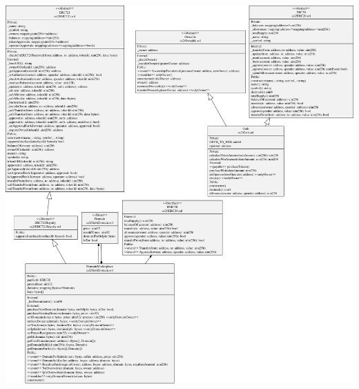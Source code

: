 \documentclass[main.tex]{subfiles}
\begin{document}
\includegraphics[scale=0.4]{figures/classDiag.pdf}
\end{document}
